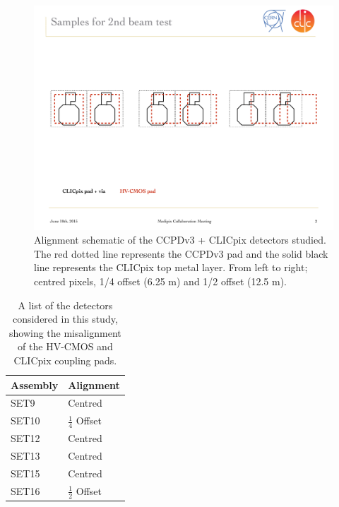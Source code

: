 \begin{figure}
\centering
\includegraphics[width=1.0\textwidth]{CLICdpVertex/Plots/misalignedPads.pdf}
\caption[Schematic of alignment of CCPDv3 and CLICpix sensors studied in this analysis.]{Alignment schematic of the CCPDv3 + CLICpix detectors studied.  The red dotted line represents the CCPDv3 pad and the solid black line represents the CLICpix top metal layer.  From left to right; centred pixels, 1/4 offset (6.25 {\mu}m) and 1/2 offset (12.5 {\mu}m).}
\label{fig:alignment}
\end{figure}

\begin{table}[h!]
\centering
\begin{tabular}{ l l }
\hline
Assembly & Alignment \\ 
\hline
SET9 & Centred \\
SET10 & $\frac{1}{4}$ Offset \\
SET12 & Centred \\
SET13 & Centred \\
SET15 & Centred \\
SET16 & $\frac{1}{2}$ Offset \\
\hline
\end{tabular}
\caption[A list of the detectors considered in this study, showing the misalignment of the HV-CMOS and CLICpix coupling pads.]{A list of the detectors considered in this study, showing the misalignment of the HV-CMOS and CLICpix coupling pads.}
\label{table:alignment}
\end{table}

